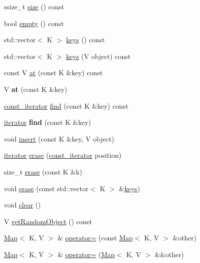 \begin{DoxyCompactItemize}
\item 
ssize\+\_\+t \hyperlink{classMap_a69c355a6d393f859d830ddb3e476c8ec}{size} () const
\item 
bool \hyperlink{classMap_aabea9760ee5af9503c1230ad29cc4db7}{empty} () const
\item 
std\+::vector$<$ K $>$ \hyperlink{classMap_a3126580ee7336d4170fde9f53c595406}{keys} () const
\item 
std\+::vector$<$ K $>$ \hyperlink{classMap_ac01797a15562fef9b26ddc36256776e8}{keys} (V object) const
\item 
const V \hyperlink{classMap_aeeeb444bb5ab7cbb672d45c59b31086a}{at} (const K \&key) const
\item 
\mbox{\label{classMap_a991f84618e03abee54408b80892356db}} 
V {\bfseries at} (const K \&key)
\item 
\hyperlink{classMap_add90fe1e25806ba6f6278b264e78ee9a}{const\+\_\+iterator} \hyperlink{classMap_ada247c3c8f2626ef3c404922807f0b9a}{find} (const K \&key) const
\item 
\mbox{\label{classMap_a37e4c5418115e784390f70c321e0cd2d}} 
\hyperlink{classMap_ad1f372a2028b9f46497e873b0e984e84}{iterator} {\bfseries find} (const K \&key)
\item 
void \hyperlink{classMap_a79ec6300dee7b2a177fab408e9c72506}{insert} (const K \&key, V object)
\item 
\hyperlink{classMap_ad1f372a2028b9f46497e873b0e984e84}{iterator} \hyperlink{classMap_ac6710b6bb8d3a2204a88c3f6b0eee1f2}{erase} (\hyperlink{classMap_add90fe1e25806ba6f6278b264e78ee9a}{const\+\_\+iterator} position)
\item 
size\+\_\+t \hyperlink{classMap_afcbe7e6aac0b0dbad94bb1cacb4d023d}{erase} (const K \&k)
\item 
void \hyperlink{classMap_af4f0fe5e119cd47edc51dadf13d001a8}{erase} (const std\+::vector$<$ K $>$ \&\hyperlink{classMap_a3126580ee7336d4170fde9f53c595406}{keys})
\item 
void \hyperlink{classMap_a80965141d2c8dfbeb55782316130a7af}{clear} ()
\item 
V \hyperlink{classMap_a99b9731b7ca8fde6c87b3d9307039e9b}{get\+Random\+Object} () const
\item 
\hyperlink{classMap}{Map}$<$ K, V $>$ \& \hyperlink{classMap_aa4378eae3c16e838cb1654d6d99bfa0b}{operator=} (const \hyperlink{classMap}{Map}$<$ K, V $>$ \&other)
\item 
\hyperlink{classMap}{Map}$<$ K, V $>$ \& \hyperlink{classMap_af08c02bad2e780d9311a57526f0ce088}{operator=} (\hyperlink{classMap}{Map}$<$ K, V $>$ \&\&other)

\end{DoxyCompactItemize}
